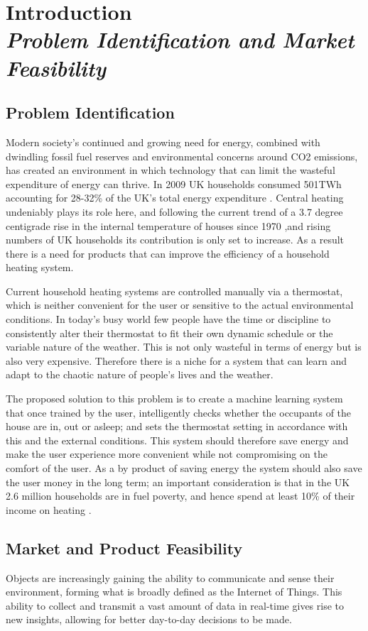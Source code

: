 \documentclass[10.5pt,a4paper,twoside]{report}   %
\newcommand\Chapter[2]{
  \chapter[#1: {\itshape#2}]{#1\\[2ex]\Large\itshape#2}
}
\begin{document}
\tableofcontents
\Chapter{Introduction}{Problem Identification and Market Feasibility}            %
\section{Problem Identification}     
Modern society's continued and growing need for energy, combined with dwindling fossil fuel reserves and environmental concerns around CO2 emissions, has created an environment in which technology that can limit the wasteful expenditure of energy can thrive.  In 2009 UK households consumed 501TWh accounting for 28-32\% of the UK's total energy expenditure \cite{GBFactFile}. Central heating undeniably plays its role here, and following the current trend of a 3.7 degree centigrade rise in the internal temperature of houses since 1970\cite{DOE2008} ,and rising numbers of UK households its contribution is only set to increase.  As a result there is a need for products that can improve the efficiency of a household heating system.

Current household heating systems are controlled manually via a thermostat, which is neither convenient for the user or sensitive to the actual environmental conditions. In today's busy world few people have the time or discipline to consistently alter their thermostat to fit their own dynamic schedule or the variable nature of the weather. This is not only wasteful in terms of energy but is also very expensive. Therefore there is a niche for a system that can learn and adapt to the chaotic nature of people's lives and the weather.  

The proposed solution to this problem is to create a machine learning system that once trained by the user, intelligently checks whether the occupants of the house are in, out or asleep; and sets the thermostat setting in accordance with this and the external conditions. This system should therefore save energy and make the user experience more convenient while not compromising on  the comfort of the user. As a by product of saving energy the system should also save the user money in the long term; an important consideration is that in the UK 2.6 million households are in fuel poverty, and hence spend at least 10\% of their income on heating \cite{DOEFP2013}. 
\section{Market and Product Feasibility}
Objects are increasingly gaining the ability to communicate and sense their environment, forming what is broadly defined as the Internet of Things. This ability to collect and transmit a vast amount of data in real-time gives rise to new insights, allowing for better day-to-day decisions to be made.
\end{document}
